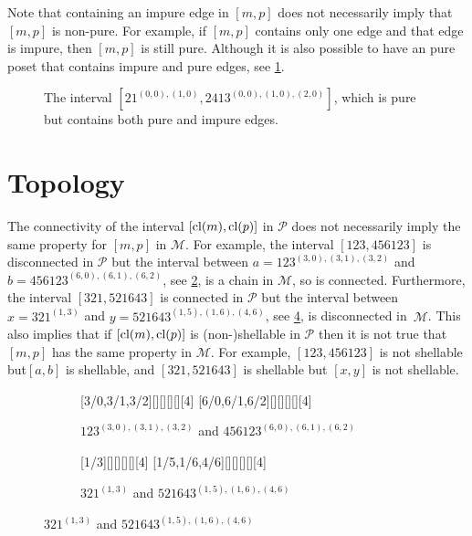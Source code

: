 \documentclass[11pt,a4paper,oneside]{article}
\begin{document}
Note that containing an impure edge in $[m,p]$ does not necessarily imply
that $[m,p]$ is non-pure. For example, if $[m,p]$ contains only one edge and
that edge is impure, then $[m,p]$ is still pure. Although it is also possible
to have an pure poset that contains impure and pure edges, see \cref{fig:pureIm}.

\begin{figure}\centering
{}
\caption{The interval $[21^{(0,0),(1,0)},2413^{(0,0),(1,0),(2,0)}]$,
 which is pure but contains both pure and impure edges.}
 \label{fig:pureIm}
\end{figure}

\section{Topology}
The connectivity of the interval $[\operatorname{\textrm{cl}}(m),\operatorname{\textrm{cl}}(p)]$ in $\mathcal{P}$ does
not necessarily imply the same property for $[m,p]$ in $\mathcal{M}$.
For example, the interval $[123,456123]$ is disconnected in $\mathcal{P}$ but the
interval between $a=123^{(3,0),(3,1),(3,2)}$ and $b=456123^{(6,0),(6,1),(6,2)}$, see
\cref{fig:123}, is a chain in $\mathcal{M}$, so is connected. Furthermore, the interval
$[321,521643]$ is connected in $\mathcal{P}$ but the interval between $x=321^{(1, 3)}$
and $y=521643^{(1, 5),(1, 6), (4, 6)}$, see \cref{fig:321}, is disconnected in~$\mathcal{M}$.
This also implies that if $[\operatorname{\textrm{cl}}(m),\operatorname{\textrm{cl}}(p)]$ is (non-)shellable in $\mathcal{P}$
then it is not true that $[m,p]$ has the same property in $\mathcal{M}$. For example,
$[123,456123]$ is not shellable but$[a,b]$ is shellable, and
$[321,521643]$ is shellable but $[x,y]$
is not shellable.

\begin{figure}[h]\centering
\begin{subfigure}{0.45\textwidth}\centering
{}[3/0,3/1,3/2][][][][][4]
[6/0,6/1,6/2][][][][][4]
\caption{$123^{(3,0),(3,1),(3,2)}$ and $456123^{(6,0),(6,1),(6,2)}$}\label{fig:123}
\end{subfigure}
\begin{subfigure}{0.45\textwidth}\centering
{}[1/3][][][][][4]
[1/5,1/6,4/6][][][][][4]
\caption{$321^{(1, 3)}$ and $521643^{(1, 5), (1, 6), (4, 6)}$}\label{fig:321}
\end{subfigure}
\end{figure}
\end{document}
